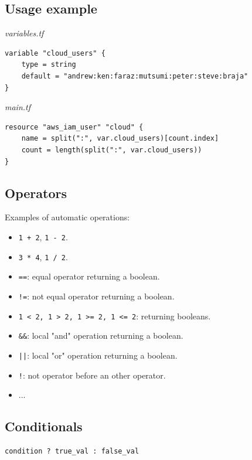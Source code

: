 \documentclass{article}
\newenvironment{codetemplate}[1][]{%
  \mybasecolorbox[#1]
  \itshape
}{%
  \endmybasecolorbox
}
\begin{document}
\subsection{Usage example}
\begin{codetemplate}{variables.tf}
\begin{verbatim}
variable "cloud_users" {
    type = string
    default = "andrew:ken:faraz:mutsumi:peter:steve:braja"
}
\end{verbatim}
\end{codetemplate}
\begin{codetemplate}{main.tf}
\begin{verbatim}
resource "aws_iam_user" "cloud" {
    name = split(":", var.cloud_users)[count.index]
    count = length(split(":", var.cloud_users))
}
\end{verbatim}
\end{codetemplate}

\subsection{Operators}

Examples of automatic operations:
\begin{itemize}
    \item \verb|1 + 2|, \verb|1 - 2|.
    \item \verb|3 * 4|, \verb|1 / 2|.
    \item \verb|==|: equal operator returning a boolean.
    \item \verb|!=|: not equal operator returning a boolean.
    \item \verb|1 < 2, 1 > 2, 1 >= 2, 1 <= 2|: returning booleans.
    \item \verb|&&|: local "and" operation returning a boolean.
    \item \verb+||+: local "or" operation returning a boolean.
    \item \verb|!|: not operator before an other operator.
    \item ...
\end{itemize}

\subsection{Conditionals}

\begin{codetemplate}{}
\begin{verbatim}
condition ? true_val : false_val
\end{verbatim}
\end{codetemplate}
\end{document}
